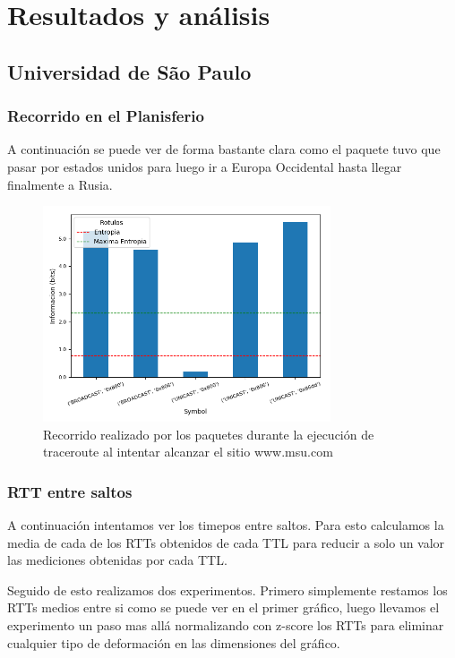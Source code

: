 \section{Resultados y análisis}

\subsection*{Universidad de São Paulo}

\subsubsection*{Recorrido en el Planisferio}

A continuación se puede ver de forma bastante clara como el paquete tuvo que pasar por estados unidos para luego ir a Europa Occidental hasta llegar finalmente a Rusia.

\begin{figure}[H]
  \centering
  \includegraphics[width=8.5cm]{figs/information_hogar_ethernet_S1_output.png}
  \caption{\normalfont Recorrido realizado por los paquetes durante la ejecución de traceroute al intentar alcanzar el sitio www.msu.com}
\end{figure}

\subsubsection*{RTT entre saltos}

A continuación intentamos ver los timepos entre saltos. Para esto calculamos la media de cada de los RTTs obtenidos de cada TTL para reducir a solo un valor las mediciones obtenidas por cada TTL. 

Seguido de esto realizamos dos experimentos. Primero simplemente restamos los RTTs medios entre si como se puede ver en el primer gráfico, luego llevamos el experimento un paso mas allá normalizando con z-score los RTTs para eliminar cualquier tipo de deformación en las dimensiones del gráfico.

